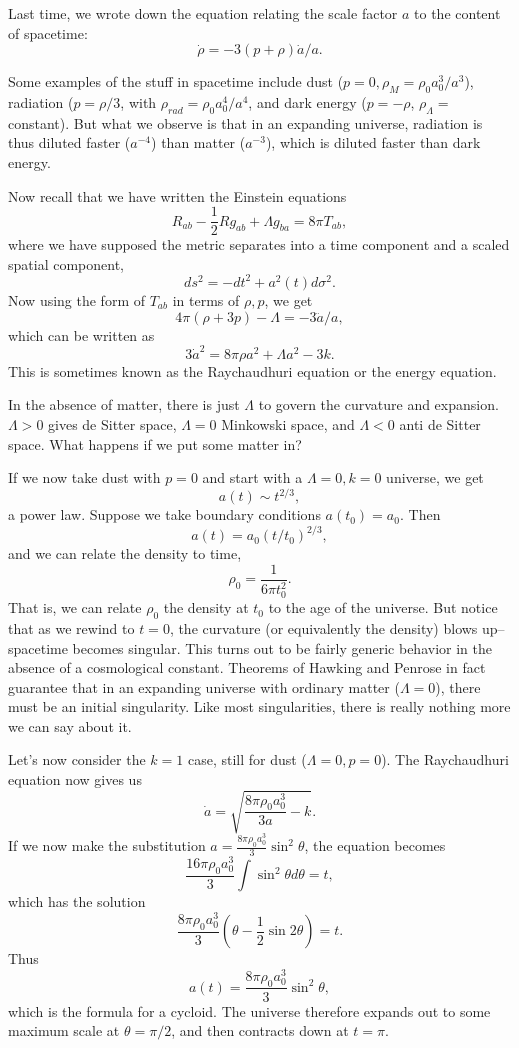 Last time, we wrote down the equation relating the scale factor $a$ to the content of spacetime:
$$\dot \rho = -3(p+\rho)\dot a/a.$$

Some examples of the stuff in spacetime include dust ($p=0,\rho_M=\rho_0 a_0^3/a^3$), radiation ($p=\rho/3$, with $\rho_{rad}=\rho_0 a_0^4/a^4$, and dark energy ($p=-\rho$, $\rho_\Lambda=$constant).
But what we observe is that in an expanding universe, radiation is thus diluted faster ($a^{-4}$) than matter ($a^{-3}$), which is diluted faster than dark energy.

Now recall that we have written the Einstein equations
$$R_{ab}-\frac{1}{2}R g_{ab}+\Lambda g_{ba}=8\pi T_{ab},$$
where we have supposed the metric separates into a time component and a scaled spatial component,
$$ds^2=-dt^2+a^2(t) d\sigma^2.$$
Now using the form of $T_{ab}$ in terms of $\rho,p$, we get
$$4\pi(\rho+3p)-\Lambda=-3\ddot a/a,$$
which can be written as
$$3\dot a^2=8\pi \rho a^2 +\Lambda a^2 -3k.$$
This is sometimes known as the Raychaudhuri equation or the energy equation.%

In the absence of matter, there is just $\Lambda$ to govern the curvature and expansion. $\Lambda >0$ gives de Sitter space, $\Lambda=0$ Minkowski space, and $\Lambda <0$ anti de Sitter space. What happens if we put some matter in?

If we now take dust with $p=0$ and start with a $\Lambda=0,k=0$ universe, we get
$$a(t)\sim t^{2/3},$$
a power law. Suppose we take boundary conditions $a(t_0)=a_0.$ Then
$$a(t)=a_0 (t/t_0)^{2/3},$$
and we can relate the density to time,
$$\rho_0=\frac{1}{6\pi t_0^2}.$$
That is, we can relate $\rho_0$ the density at $t_0$ to the age of the universe. But notice that as we rewind to $t=0$, the curvature (or equivalently the density) blows up-- spacetime becomes singular. This turns out to be fairly generic behavior in the absence of a cosmological constant. Theorems of Hawking and Penrose in fact guarantee that in an expanding universe with ordinary matter ($\Lambda=0$), there must be an initial singularity. %
Like most singularities, there is really nothing more we can say about it.

Let's now consider the $k=1$ case, still for dust ($\Lambda=0,p=0$). The Raychaudhuri equation now gives us
$$\dot a=\sqrt{\frac{8\pi \rho_0 a_0^3}{3a}-k}.$$ If we now make the substitution $a=\frac{8\pi \rho_0 a_0^3}{3}\sin^2\theta$, the equation becomes
$$\frac{16\pi \rho_0 a_0^3}{3} \int \sin^2\theta d\theta =t,$$
which has the solution
$$\frac{8\pi \rho_0 a_0^3}{3}(\theta-\frac{1}{2}\sin 2\theta)=t.$$ Thus
$$a(t)=\frac{8\pi \rho_0 a_0^3}{3}\sin^2\theta,$$
which is the formula for a cycloid. The universe therefore expands out to some maximum scale at $\theta=\pi/2$, and then contracts down at $t=\pi$.

